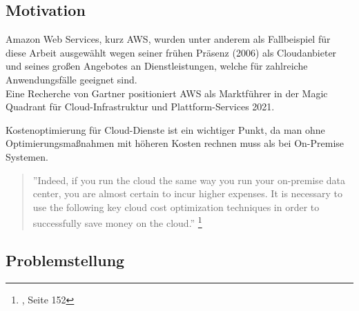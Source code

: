 \subsection*{Motivation}
Amazon Web Services, kurz AWS, wurden unter anderem als Fallbeispiel für diese Arbeit ausgewählt wegen seiner frühen Präsenz (2006) als Cloudanbieter und seines großen Angebotes an Dienstleistungen, welche für zahlreiche Anwendungsfälle geeignet sind.
\\
Eine Recherche von Gartner positioniert AWS als Marktführer in der Magic Quadrant für Cloud-Infrastruktur und Plattform-Services 2021.
{\cite{G01}}
\begin{comment} GELÖSCHT, WEIL DIESE EINE BEHAUPTUNG IST (25.10.2021)
\\\\
Für viele Unternehmen ist eine große Herausforderung, die Kosten von Cloud-Diensten übersichtlich zu halten und Optimierungsmöglichkeit leicht zu erkennen. Zusätzlich besteht die Gefahr, unangenehme Überraschungen in einer Rechnung zu bekommen, weil keine Grenze für den Konsum von Cloud-Diensten festgelegt wurde. 
\end{comment}
Kostenoptimierung für Cloud-Dienste ist ein wichtiger Punkt, da man ohne Optimierungsmaßnahmen mit höheren Kosten rechnen muss als bei On-Premise Systemen.
\\
\begin{quote}
    ”Indeed, if you run the cloud the same way you run your on-premise data center, you are almost certain to incur higher expenses. It is necessary to use the following key cloud cost optimization techniques in order to successfully save money on the cloud.”
    \footnote{{\cite{CCB}}, Seite 152}
\end{quote}

\subsection*{Problemstellung}

